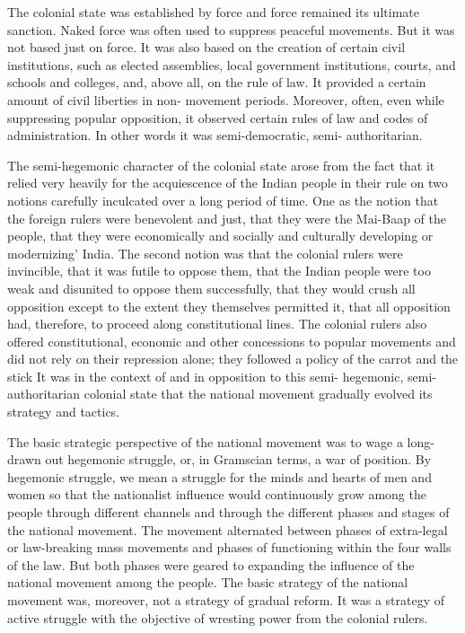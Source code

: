 The colonial state was established by force and force remained its ultimate sanction. Naked force was often used to suppress peaceful movements. But it was not based just on force. It was also based on the creation of certain civil institutions, such as elected assemblies, local government institutions, courts, and schools and colleges, and, above all, on the rule of law. It provided a certain amount of civil liberties in non- movement periods. Moreover, often, even while suppressing popular opposition, it observed certain rules of law and codes of administration. In other words it was semi-democratic, semi- authoritarian. 

The semi-hegemonic character of the colonial state arose from the fact that it relied very heavily for the acquiescence of the Indian people in their rule on two notions carefully inculcated over a long period of time. One as the notion that the foreign rulers were benevolent and just, that they were the Mai-Baap of the people, that they were economically and socially and culturally developing or modernizing' India. The second notion was that the colonial rulers were invincible, that it was futile to oppose them, that the Indian people were too weak and disunited to oppose them successfully, that they would crush all opposition except to the extent they themselves permitted it, that all opposition had, therefore, to proceed along constitutional lines. The colonial rulers also offered constitutional, economic and other concessions to popular movements and did not rely on their repression alone; they followed a policy of the carrot and the stick It was in the context of and in opposition to this semi- hegemonic, semi-authoritarian colonial state that the national movement gradually evolved its strategy and tactics. 

The basic strategic perspective of the national movement was to wage a long-drawn out hegemonic struggle, or, in Gramscian terms, a war of position. By hegemonic struggle, we mean a struggle for the minds and hearts of men and women so that the nationalist influence would continuously grow among the people through different channels and through the different phases and stages of the national movement. The movement alternated between phases of extra-legal or law-breaking mass movements and phases of functioning within the four walls of the law. But both phases were geared to expanding the influence of the national movement among the people. The basic strategy of the national movement was, moreover, not a strategy of gradual reform. It was a strategy of active struggle with the objective of wresting power from the colonial rulers. 

